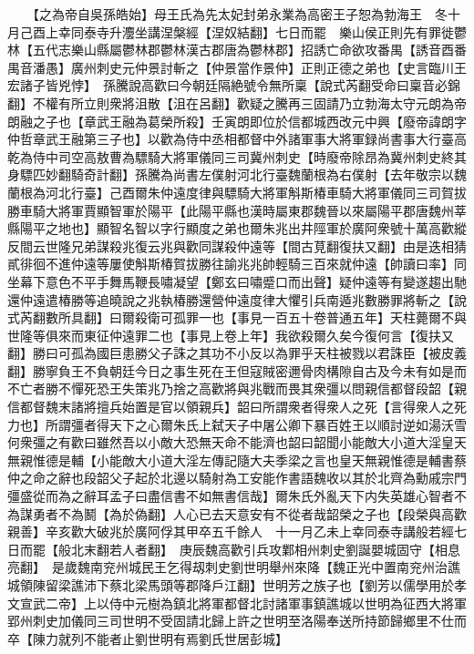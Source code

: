 　　【之為帝自吳孫皓始】母王氏為先太妃封弟永業為高密王子恕為勃海王　冬十月己酉上幸同泰寺升灋坐講涅槃經【涅奴結翻】七日而罷　樂山侯正則先有罪徙鬱林【五代志樂山縣屬鬱林郡鬱林漢古郡唐為鬱林郡】招誘亡命欲攻番禺【誘音酉番禺音潘愚】廣州刺史元仲景討斬之【仲景當作景仲】正則正德之弟也【史言臨川王宏諸子皆兇悖】　孫騰說高歡曰今朝廷隔絶號令無所稟【說式芮翻受命曰稟音必錦翻】不權有所立則衆將沮散【沮在呂翻】歡疑之騰再三固請乃立勃海太守元朗為帝朗融之子也【章武王融為葛榮所殺】壬寅朗即位於信都城西改元中興【廢帝諱朗字仲哲章武王融第三子也】以歡為侍中丞相都督中外諸軍事大將軍録尚書事大行臺高乾為侍中司空高敖曹為驃騎大將軍儀同三司冀州刺史【時廢帝除昂為冀州刺史終其身驃匹妙翻騎奇計翻】孫騰為尚書左僕射河北行臺魏蘭根為右僕射【去年敬宗以魏蘭根為河北行臺】己酉爾朱仲遠度律與驃騎大將軍斛斯椿車騎大將軍儀同三司賀拔勝車騎大將軍賈顯智軍於陽平【此陽平縣也漢時屬東郡魏晉以來屬陽平郡唐魏州莘縣陽平之地也】顯智名智以字行顯度之弟也爾朱兆出井陘軍於廣阿衆號十萬高歡縱反間云世隆兄弟謀殺兆復云兆與歡同謀殺仲遠等【間古莧翻復扶又翻】由是迭相猜貳徘徊不進仲遠等屢使斛斯椿賀拔勝往諭兆兆帥輕騎三百來就仲遠【帥讀曰率】同坐幕下意色不平手舞馬鞭長嘯凝望【鄭玄曰嘯蹙口而出聲】疑仲遠等有變遂趨出馳還仲遠遣椿勝等追曉說之兆執椿勝還營仲遠度律大懼引兵南遁兆數勝罪將斬之【說式芮翻數所具翻】曰爾殺衛可孤罪一也【事見一百五十卷普通五年】天柱薨爾不與世隆等俱來而東征仲遠罪二也【事見上卷上年】我欲殺爾久矣今復何言【復扶又翻】勝曰可孤為國巨患勝父子誅之其功不小反以為罪乎天柱被戮以君誅臣【被皮義翻】勝寧負王不負朝廷今日之事生死在王但寇賊密邇骨肉構隙自古及今未有如是而不亡者勝不憚死恐王失策兆乃捨之高歡將與兆戰而畏其衆彊以問親信都督段韶【親信都督魏末諸將擅兵始置是官以領親兵】韶曰所謂衆者得衆人之死【言得衆人之死力也】所謂彊者得天下之心爾朱氏上弑天子中屠公卿下暴百姓王以順討逆如湯沃雪何衆彊之有歡曰雖然吾以小敵大恐無天命不能濟也韶曰韶聞小能敵大小道大淫皇天無親惟德是輔【小能敵大小道大淫左傳記隨大夫季梁之言也皇天無親惟德是輔書蔡仲之命之辭也段韶父子起於北邊以騎射為工安能作書語魏收以其於北齊為勳戚宗門彊盛從而為之辭耳孟子曰盡信書不如無書信哉】爾朱氏外亂天下内失英雄心智者不為謀勇者不為鬭【為於偽翻】人心已去天意安有不從者哉韶榮之子也【段榮與高歡親善】辛亥歡大破兆於廣阿俘其甲卒五千餘人　十一月乙未上幸同泰寺講般若經七日而罷【般北末翻若人者翻】　庚辰魏高歡引兵攻鄴相州刺史劉誕嬰城固守【相息亮翻】　是歲魏南兖州城民王乞得刼刺史劉世明舉州來降【魏正光中置南兖州治譙城領陳留梁譙沛下蔡北梁馬頭等郡降戶江翻】世明芳之族子也【劉芳以儒學用於孝文宣武二帝】上以侍中元樹為鎮北將軍都督北討諸軍事鎮譙城以世明為征西大將軍郢州刺史加儀同三司世明不受固請北歸上許之世明至洛陽奉送所持節歸鄉里不仕而卒【陳力就列不能者止劉世明有焉劉氏世居彭城】

